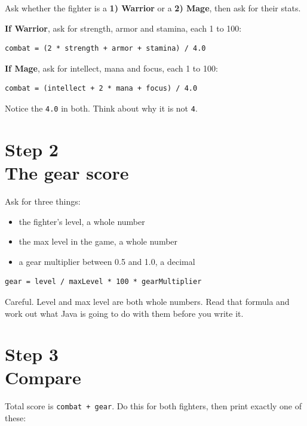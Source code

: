 \documentclass[11pt]{article}
\newcommand{\parttag}[1]{{\sffamily\footnotesize\color{arcane}#1}\\[1pt]}
\newcommand{\code}[1]{\texttt{#1}}
\begin{document}
Ask whether the fighter is a \textbf{1) Warrior} or a \textbf{2) Mage}, then ask for their stats.

\textbf{If Warrior}, ask for strength, armor and stamina, each 1 to 100:

\begin{lstlisting}[style=term]
combat = (2 * strength + armor + stamina) / 4.0
\end{lstlisting}

\textbf{If Mage}, ask for intellect, mana and focus, each 1 to 100:

\begin{lstlisting}[style=term]
combat = (intellect + 2 * mana + focus) / 4.0
\end{lstlisting}

\begin{note}
Notice the \code{4.0} in both. Think about why it is not \code{4}.
\end{note}

\section{\parttag{Step 2}The gear score}

Ask for three things:

\begin{itemize}
\item the fighter's level, a whole number
\item the max level in the game, a whole number
\item a gear multiplier between 0.5 and 1.0, a decimal
\end{itemize}

\begin{lstlisting}[style=term]
gear = level / maxLevel * 100 * gearMultiplier
\end{lstlisting}

\begin{note}[bronze]
Careful. Level and max level are both whole numbers. Read that formula and work out what Java is going to do with them before you write it.
\end{note}

\section{\parttag{Step 3}Compare}

Total score is \code{combat + gear}. Do this for both fighters, then print exactly one of these:
\end{document}
